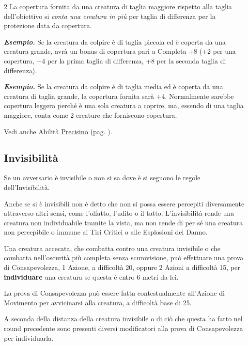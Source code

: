 \begin{multicols}{2}
La copertura fornita da una creatura di taglia maggiore rispetto alla taglia dell'obiettivo si \emph{conta una creatura in più} per taglia di differenza per la protezione data da copertura.

\textbf{\textit{Esempio.}} Se la creatura da colpire è di taglia piccola ed è coperta da una creatura grande, avrà un bonus di copertura pari a Completa +8 (+2 per una copertura, +4 per la prima taglia di differenza, +8 per la seconda taglia di differenza).

\textbf{\textit{Esempio.}} Se la creatura da colpire è di taglia media ed è coperta da una creatura di taglia grande, la copertura fornita sarà +4. Normalmente sarebbe copertura leggera perché è una sola creatura a coprire, ma, essendo di una taglia maggiore, conta come 2 creature che forniscono copertura.

Vedi anche Abilità \hyperlink{Precisino}{Precisino} (pag. \pageref{Precisino}).

\subsection{Invisibilità} \hypertarget{invisibilita}{}\label{invisibilita}

Se un avversario è invisibile o non si sa dove è si seguono le regole dell'Invisibilità.

Anche se si è invisibili non è detto che non si possa essere percepiti diversamente attraverso altri sensi, come l'olfatto, l'udito o il tatto. L'invisibilità rende una creatura non individuabile tramite la vista, ma non rende di per sé una creatura non percepibile o immune ai Tiri Critici o alle Esplosioni del Danno.

Una creatura accecata, che combatta contro una creatura invisibile o che combatta nell'oscurità più completa senza scurovisione, può effettuare una prova di Consapevolezza, 1 Azione, a difficoltà 20, oppure 2 Azioni a difficoltà 15, per \textbf{individuare} una creatura se questa è entro 6 metri da lei.

La prova di Consapevolezza può essere fatta contestualmente all'Azione di Movimento per avvicinarsi alla creatura, a difficoltà base di 25.

A seconda della distanza della creatura invisibile o di ciò che questa ha fatto nel round precedente sono presenti diversi modificatori alla prova di Consapevolezza per individuarla.

\medskip


\end{multicols}
